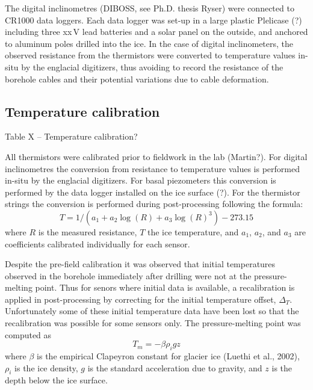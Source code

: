 \documentclass[utf8]{article}
\begin{document}
    The digital inclinometres (DIBOSS, see Ph.D. thesis Ryser) were connected
    to CR1000 data loggers. Each data logger was set-up in a large plastic
    Plelicase (?) including three xx\,V lead batteries and a solar panel on the
    outside, and anchored to aluminum poles drilled into the ice.
    In the case of digital inclinometers, the observed resistance from the
    thermistors were converted to temperature values in-situ by the englacial
    digitizers, thus avoiding to record the resistance of the borehole cables
    and their potential variations due to cable deformation.


\subsection{Temperature calibration}

    Table X -- Temperature calibration?

    All thermistors were calibrated prior to fieldwork in the lab (Martin?).
    For digital inclinometres the conversion from resistance to temperature
    values is performed in-situ by the englacial digitizers. For basal
    piezometers this conversion is performed by the data logger installed on
    the ice surface (?). For the thermistor strings the conversion is performed
    during post-processing following the formula:
    \begin{equation}
      T = 1 / (a_1 + a_2 \log(R) + a_3 \log(R)^3) - 273.15
    \end{equation}
    where $R$ is the measured resistance, $T$ the ice temperature, and $a_1$,
    $a_2$, and $a_3$ are coefficients calibrated individually for each sensor.

    Despite the pre-field calibration it was observed that initial temperatures
    observed in the borehole immediately after drilling were not at the
    pressure-melting point. Thus for senors where initial data is available,
    a recalibration is applied in post-processing by correcting for the initial
    temperature offset, $\Delta_T$. Unfortunately some of these initial
    temperature data have been lost so that the recalibration was possible for
    some sensors only. The pressure-melting point was computed as
    \begin{equation}
      T_m = -\beta \rho_i g z
    \end{equation}
    where $\beta$ is the empirical Clapeyron constant for glacier ice
    (Luethi et al., 2002), $\rho_i$ is the ice density, $g$ is the standard
    acceleration due to gravity, and $z$ is the depth below the ice surface.
\end{document}
